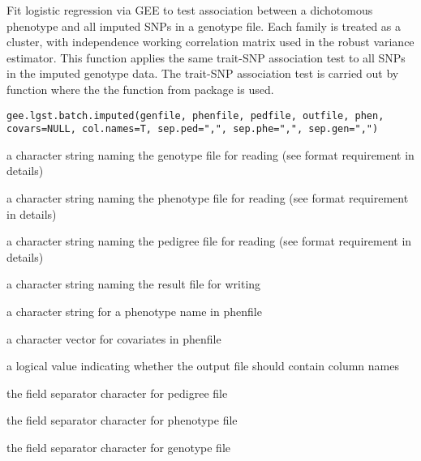 \begin{Description}\relax
Fit logistic regression via GEE to test association between a dichotomous phenotype 
and all imputed SNPs in a genotype file. Each family is treated as 
a cluster, with independence working correlation matrix used in the robust variance estimator.
This function applies the same trait-SNP association test to all SNPs in the imputed genotype data. 
The trait-SNP association test is carried out by  function where the 
the  function from package  is used.
\end{Description}
\begin{Usage}
\begin{verbatim}
gee.lgst.batch.imputed(genfile, phenfile, pedfile, outfile, phen, 
covars=NULL, col.names=T, sep.ped=",", sep.phe=",", sep.gen=",")
\end{verbatim}
\end{Usage}
\begin{Arguments}
\begin{ldescription}
\item[\code{genfile}] a character string naming the genotype file for reading (see format requirement in details) 
\item[\code{phenfile}] a character string naming the phenotype file for reading (see format requirement in details) 
\item[\code{pedfile}] a character string naming the pedigree file for reading (see format requirement in details) 
\item[\code{outfile}] a character string naming the result file for writing 
\item[\code{phen}] a character string for a phenotype name in phenfile 
\item[\code{covars}] a character vector for covariates in phenfile 
\item[\code{col.names}] a logical value indicating whether the output file should contain column names 
\item[\code{sep.ped}] the field separator character for pedigree file 
\item[\code{sep.phe}] the field separator character for phenotype file 
\item[\code{sep.gen}] the field separator character for genotype file 
\end{ldescription}
\end{Arguments}
